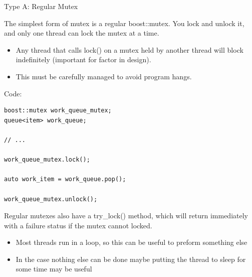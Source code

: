 \documentclass[8pt]{beamer}
\begin{document}
\begin{frame}[fragile]{Type A: Regular Mutex}
 
The simplest form of mutex is a regular boost::mutex. You lock and unlock it, and only one thread can lock the mutex at a time. 

\begin{itemize}
  \item Any thread that calls lock() on a mutex held by another thread will block indefinitely (important for factor in design).
  \item This must be carefully managed to avoid program hangs.
\end{itemize}

\begin{exampleblock}{Code:}
 
\begin{lstlisting}
boost::mutex work_queue_mutex;
queue<item> work_queue;

// ...

work_queue_mutex.lock();

auto work_item = work_queue.pop();

work_queue_mutex.unlock();
\end{lstlisting}

\end{exampleblock}

Regular mutexes also have a try\_lock() method, which will return immediately with a failure status if the mutex cannot locked. 
\begin{itemize}
  \item Most threads run in a loop, so this can be useful to preform something else
  \item In the case nothing else can be done maybe putting the thread to sleep for some time may be useful
\end{itemize}
 
\end{frame}
\end{document}
